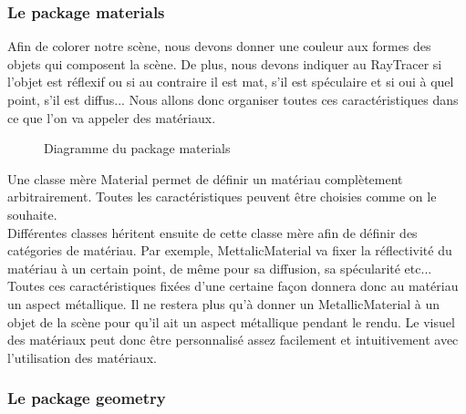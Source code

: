 \documentclass[11pt]{article}
\begin{document}
\subsubsection{Le package materials}

Afin de colorer notre scène, nous devons donner une couleur aux formes des objets qui composent la scène. De plus, nous devons indiquer au RayTracer si l'objet est réflexif ou si au contraire il est mat, s'il est spéculaire et si oui à quel point, s'il est diffus...
Nous allons donc organiser toutes ces caractéristiques dans ce que l'on va appeler des matériaux.

\begin{figure}[h!]
	
	\caption{Diagramme du package materials}
	\label{diagrammePackageMaterials}
\end{figure}
\FloatBarrier

Une classe mère Material permet de définir un matériau complètement arbitrairement. Toutes les caractéristiques peuvent être choisies comme on le souhaite.\\
Différentes classes héritent ensuite de cette classe mère afin de définir des catégories de matériau. Par exemple, MettalicMaterial va fixer la réflectivité du matériau à un certain point, de même pour sa diffusion, sa spécularité etc... Toutes ces caractéristiques fixées d'une certaine façon donnera donc au matériau un aspect métallique. Il ne restera plus qu'à donner un MetallicMaterial à un objet de la scène pour qu'il ait un aspect métallique pendant le rendu. Le visuel des matériaux peut donc être personnalisé assez facilement et intuitivement avec l'utilisation des matériaux.

\subsubsection{Le package geometry}
\end{document}
